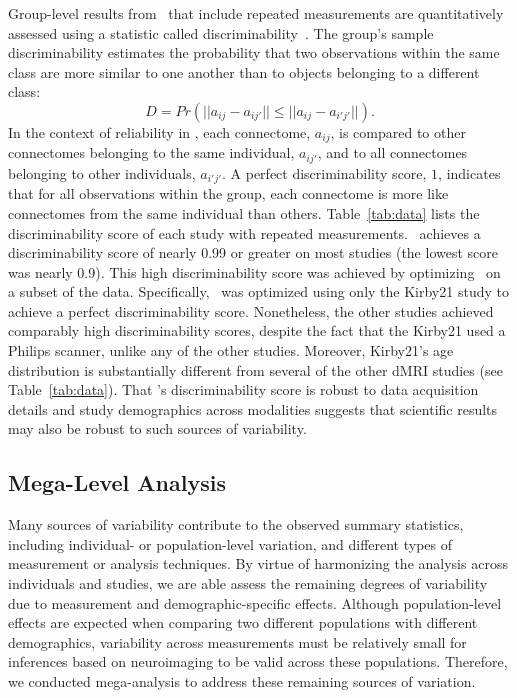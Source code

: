 \documentclass[11pt]{article}
\begin{document}
\begin{multicols}{2}
Group-level results from \ndmg~that include repeated measurements are quantitatively assessed using a statistic called discriminability~\cite{discriminability}.
The group's sample discriminability estimates the probability that two observations within the same class are more similar to one another than to objects belonging to a different class:
\begin{equation}
D = Pr(|| a_{ij} - a_{ij'} || \leq || a_{ij} - a_{i'j'} ||).
\label{eq:disc}
\end{equation}
In the context of reliability in \ndmg, each connectome, $a_{ij}$, is compared to other connectomes belonging to the same individual, $a_{ij'}$, and to all connectomes belonging to other individuals, $a_{i'j'}$.
A perfect discriminability score, $1$, indicates that for all observations within the group, each connectome is more like connectomes from the same individual than others.
Table~\ref{tab:data} lists the discriminability score of each study with repeated measurements.
\ndmg~achieves a discriminability score of nearly 0.99 or greater on most studies (the lowest score was nearly 0.9).
This high discriminability score was achieved by optimizing \ndmg~on a subset of the data.
Specifically, \ndmg~was optimized using only the Kirby21 study to achieve a perfect discriminability score. 
Nonetheless, the other studies achieved comparably high discriminability scores, despite the fact that the Kirby21 used a Philips scanner, unlike any of the other studies.
Moreover, Kirby21's age distribution is substantially different from several of the other dMRI studies (see Table~\ref{tab:data}).
That \ndmg's discriminability score is robust to data acquisition details and study demographics across modalities suggests that scientific results may also be robust to such sources of variability.


\subsection{Mega-Level Analysis}

Many sources of variability contribute to the observed summary statistics, including individual- or population-level variation, and different types of measurement or analysis techniques.
By virtue of harmonizing the analysis across individuals and studies, we are able assess the remaining degrees of variability due to measurement and demographic-specific effects.
Although population-level effects are expected when comparing two different populations with different demographics, variability across measurements must be relatively small for inferences based on neuroimaging to be valid across these populations.
Therefore, we conducted mega-analysis to address these remaining sources of variation.


\end{multicols}
\end{document}
